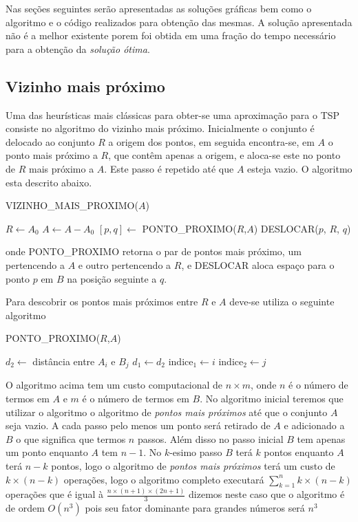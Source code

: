 \documentclass[a4paper, 12pt]{article}
\begin{document}
\newpage

	Nas seções seguintes serão apresentadas as soluções gráficas bem como o
algoritmo e o código realizados para obtenção das mesmas.
	A solução apresentada não é a melhor existente porem foi obtida em uma
fração do tempo necessário para a obtenção da \emph{solução ótima}.


\subsection{Vizinho mais próximo}

	Uma das heurísticas mais clássicas para obter-se uma aproximação para o TSP
consiste no algoritmo do vizinho mais próximo. Inicialmente o conjunto é
delocado ao conjunto $R$ a origem dos pontos, em seguida encontra-se, em $A$ o
ponto mais próximo a $R$, que contêm apenas a origem, e aloca-se este no ponto
de $R$ mais próximo a $A$. Este passo é repetido até que $A$ esteja vazio. O
algoritmo esta descrito abaixo.

\begin{algorithm}[H]
\caption{VIZINHO\_MAIS\_PROXIMO($A$)}
\begin{algorithmic}
 \State $R \leftarrow A_0$
 \State $A \leftarrow A-{A_0}$
  \State $ [p,q] \leftarrow$ PONTO\_PROXIMO($R$,$A$)
  \State DESLOCAR($p$, $R$, $q$)
 \EndWhile
\end{algorithmic}
\end{algorithm}
	onde PONTO\_PROXIMO retorna o par de pontos mais próximo, um pertencendo a
$A$ e outro pertencendo a $R$, e DESLOCAR aloca espaço para o ponto $p$ em $B$
na posição seguinte a $q$.

	Para descobrir os pontos mais próximos entre $R$ e $A$ deve-se utiliza o
seguinte algoritmo

\begin{algorithm}[H]
\caption{PONTO\_PROXIMO($R$,$A$)}
\begin{algorithmic}
			\State $d_2 \leftarrow $ distância entre $A_i$ e $B_j$
				\State $d_1 \leftarrow d_2$
				\State $\textrm{indice}_1 \leftarrow i$
				\State $\textrm{indice}_2 \leftarrow j$
			\EndIf
		\EndFor
	\EndFor
\end{algorithmic}
\end{algorithm}

	O algoritmo acima tem um custo computacional de $n\times m$, onde $n$ é o
número de termos em $A$ e $m$ é o número de termos em $B$. No algoritmo inicial
teremos que utilizar o algoritmo o algoritmo de \emph{pontos mais próximos} até
que o conjunto $A$ seja vazio. A cada passo pelo menos um ponto será retirado de
$A$ e adicionado a $B$ o que significa que termos $n$ passos. Além disso no
passo inicial $B$ tem apenas um ponto enquanto $A$ tem $n-1$. No $k$-esimo passo
$B$ terá $k$ pontos enquanto $A$ terá $n-k$ pontos, logo o algoritmo de
\emph{pontos mais próximos} terá um custo de $k\times(n-k)$ operações, logo o
algoritmo completo executará $\sum_{k=1}^{n} k\times (n-k)$ operações que é
igual à $\frac{n\times(n+1)\times(2n+1)}{3}$ dizemos neste caso que o algoritmo
é de ordem $O(n^3)$ pois seu fator dominante para grandes números será $n^3$
\end{document}

